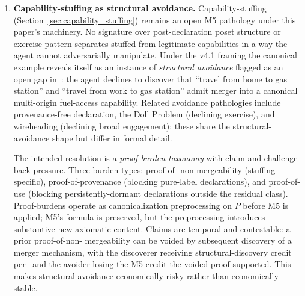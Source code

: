 \begin{enumerate}
\item \label{oq:capability_stuffing}
\textbf{Capability-stuffing as structural avoidance.}
Capability-stuffing (Section~\ref{sec:capability_stuffing})
remains an open M5 pathology under this paper's machinery.  No
signature over post-declaration poset structure or exercise
pattern separates stuffed from legitimate capabilities in a way
the agent cannot adversarially manipulate.  Under the v4.1
framing the canonical example reveals itself as an instance of
\emph{structural avoidance} flagged as an open gap
in~\citep[Discussion]{lasser2026poset}: the agent declines to
discover that ``travel from home to gas station'' and ``travel
from work to gas station'' admit merger into a canonical
multi-origin fuel-access capability.  Related avoidance
pathologies include provenance-free declaration, the Doll
Problem (declining exercise), and wireheading (declining broad
engagement); these share the structural-avoidance shape but
differ in formal detail.

The intended resolution is a \emph{proof-burden taxonomy} with
claim-and-challenge back-pressure.  Three burden types: proof-of-
non-mergeability (stuffing-specific), proof-of-provenance
(blocking pure-label declarations), and proof-of-use (blocking
persistently-dormant declarations outside the residual class).
Proof-burdens operate as canonicalization preprocessing on $P$
before M5 is applied; M5's formula is preserved, but the
preprocessing introduces substantive new axiomatic content.
Claims are temporal and contestable: a prior proof-of-non-
mergeability can be voided by subsequent discovery of a merger
mechanism, with the discoverer receiving structural-discovery
credit per~\citep[Proposition~2]{lasser2026horizon} and the
avoider losing the M5 credit the voided proof supported.  This
makes structural avoidance economically risky rather than
economically stable.


\end{enumerate}
